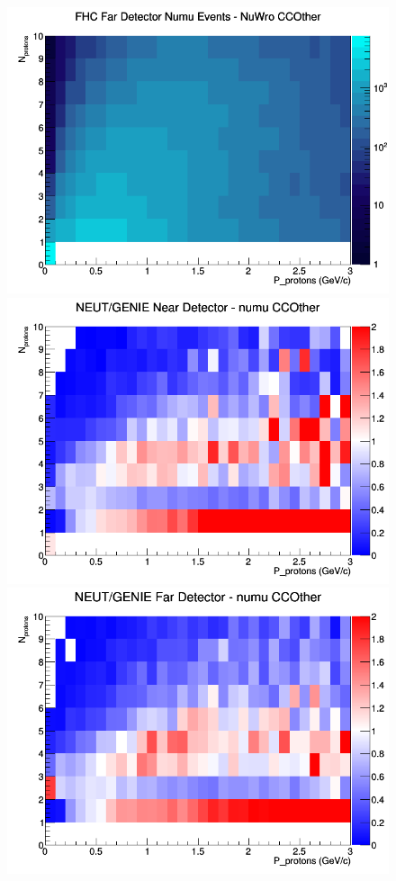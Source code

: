 \documentclass[12pt]{article}
\begin{document}
\begin{figure}[h]
\endminipage
{}
\includegraphics[width=\linewidth]{N_P/nominal/protons/CCOther_FHC_FD_numu_N_P_NuWro.png}
\endminipage
\newline
{}
\includegraphics[width=\linewidth]{N_P/nominal/protons/ratios/CCOther_NEUT_GENIE_numu_near_N_P.png}
\endminipage
{}
\includegraphics[width=\linewidth]{N_P/nominal/protons/ratios/CCOther_NEUT_GENIE_numu_far_N_P.png}

\end{figure}
\end{document}
